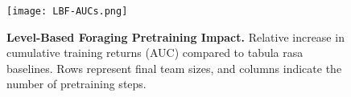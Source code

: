 \begin{figure}[ht]
    \centering
    \texttt{[image: LBF-AUCs.png]}
    \caption{\textbf{Level-Based Foraging Pretraining Impact.} 
    Relative increase in cumulative training returns (AUC) compared to tabula rasa baselines. 
    Rows represent final team sizes, and columns indicate the number of pretraining steps.}
    \label{con1:fig:lbf-aucs}
\end{figure}

\FloatBarrier

